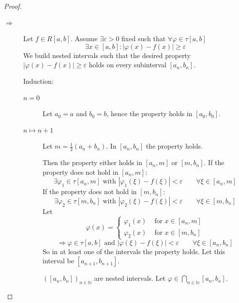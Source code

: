 \documentclass[a4paper,landscape,twocolumn]{article}
\theoremstyle{definition}
\newcommand\abs[1]{\left|#1\right|}
\begin{document}
\begin{proof}
  \begin{description}
    \item[$\Rightarrow$]
      Let $f \in R[a,b]$.
      Assume $\exists \varepsilon > 0$ fixed such that $\forall \varphi \in \tau[a,b]$
      \[ \exists x \in [a,b]: \abs{\varphi(x) - f(x)} \geq \varepsilon \]
      We build nested intervals such that the desired property $\abs{\varphi(x) - f(x)} \geq \varepsilon$
      holds on every subinterval $[a_n, b_n]$.

      Induction:
      \begin{description}
        \item[$n=0$] Let $a_0 = a$ and $b_0 = b$, hence the property holds in $[a_0, b_0]$.
        \item[$n\mapsto n+1$]
        Let $m = \frac12 (a_n + b_n)$. In $[a_n,b_n]$ the property holds.

        Then the property either holds in $[a_n,m]$ or $[m,b_n]$.
        If the property does not hold in $[a_n,m]$:
        \[ \exists \varphi_1 \in \tau[a_n,m] \text{ with } \abs{\varphi_1(\xi) - f(\xi)} < \varepsilon \qquad \forall \xi \in [a_n,m] \]
        If the property does not hold in $[m,b_n]$:
        \[ \exists \varphi_2 \in \tau[m,b_n] \text{ with } \abs{\varphi_2(\xi) - f(\xi)} < \varepsilon \qquad \forall \xi \in [m,b_n] \]
        Let
        \[
          \varphi(x) = \begin{cases}
            \varphi_1(x) & \text{ for } x \in [a_n,m] \\
            \varphi_2(x) & \text{ for } x \in [m,b_n]
          \end{cases}
        \]
        \[ \Rightarrow \varphi \in \tau[a,b] \text{ and } \abs{\varphi(\xi) - f(\xi)} < \varepsilon \qquad \forall \xi \in [a_n,b_n] \]
        So in at least one of the intervals the property holds.
        Let this interval be $[a_{n+1},b_{n+1}]$.

        $([a_n,b_n])_{n\in \mathbb N}$ are nested intervals.
        Let $\varphi \in \bigcap_{n \in \mathbb N} [a_n, b_n]$.


\end{description}
\end{description}
\end{proof}
\end{document}

